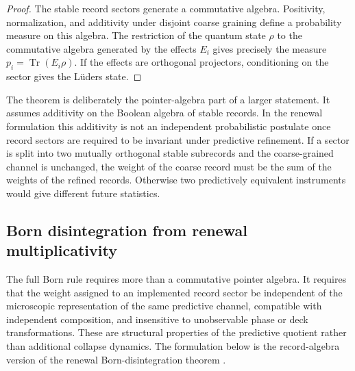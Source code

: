 \documentclass[11pt]{article}
\numberwithin{equation}{section}
\theoremstyle{definition}
\theoremstyle{remark}
\newcommand{\Tr}{\operatorname{Tr}}
\begin{document}
\begin{proof}
The stable record sectors generate a commutative algebra.  Positivity, normalization, and additivity under disjoint coarse graining define a probability measure on this algebra.  The restriction of the quantum state \(\rho\) to the commutative algebra generated by the effects \(E_i\) gives precisely the measure \(p_i=\Tr(E_i\rho)\).  If the effects are orthogonal projectors, conditioning on the sector gives the L\"uders state.
\end{proof}

The theorem is deliberately the pointer-algebra part of a larger statement.  It assumes additivity on the Boolean algebra of stable records.  In the renewal formulation this additivity is not an independent probabilistic postulate once record sectors are required to be invariant under predictive refinement.  If a sector is split into two mutually orthogonal stable subrecords and the coarse-grained channel is unchanged, the weight of the coarse record must be the sum of the weights of the refined records.  Otherwise two predictively equivalent instruments would give different future statistics.

\subsection{Born disintegration from renewal multiplicativity}
\label{subsec:born-disintegration}

The full Born rule requires more than a commutative pointer algebra.  It requires that the weight assigned to an implemented record sector be independent of the microscopic representation of the same predictive channel, compatible with independent composition, and insensitive to unobservable phase or deck transformations.  These are structural properties of the predictive quotient rather than additional collapse dynamics.  The formulation below is the record-algebra version of the renewal Born-disintegration theorem \cite{PelissierBorn}.
\end{document}

